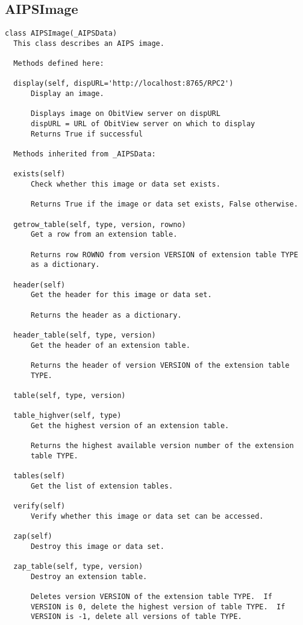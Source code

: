 \documentclass[11pt]{report}
\begin{document}
\subsection{AIPSImage}
\begin{verbatim}
class AIPSImage(_AIPSData)
  This class describes an AIPS image.
  
  Methods defined here:

  display(self, dispURL='http://localhost:8765/RPC2')
      Display an image.
      
      Displays image on ObitView server on dispURL
      dispURL = URL of ObitView server on which to display
      Returns True if successful

  Methods inherited from _AIPSData:
  
  exists(self)
      Check whether this image or data set exists.
      
      Returns True if the image or data set exists, False otherwise.
  
  getrow_table(self, type, version, rowno)
      Get a row from an extension table.
      
      Returns row ROWNO from version VERSION of extension table TYPE
      as a dictionary.
  
  header(self)
      Get the header for this image or data set.
      
      Returns the header as a dictionary.
  
  header_table(self, type, version)
      Get the header of an extension table.
      
      Returns the header of version VERSION of the extension table
      TYPE.
  
  table(self, type, version)
  
  table_highver(self, type)
      Get the highest version of an extension table.
      
      Returns the highest available version number of the extension
      table TYPE.
  
  tables(self)
      Get the list of extension tables.
  
  verify(self)
      Verify whether this image or data set can be accessed.
  
  zap(self)
      Destroy this image or data set.
  
  zap_table(self, type, version)
      Destroy an extension table.
      
      Deletes version VERSION of the extension table TYPE.  If
      VERSION is 0, delete the highest version of table TYPE.  If
      VERSION is -1, delete all versions of table TYPE.
  


\end{verbatim}
\end{document}

